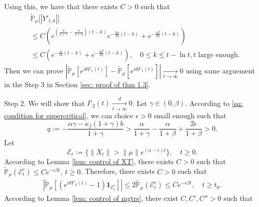\documentclass[12pt]{amsart}
\theoremstyle{plain}
\theoremstyle{definition}
\numberwithin{equation}{section}
\begin{document}
	Using this, we have that there exists $C > 0$ such that
\begin{align*}
    &\mathbb{\tilde{P}}_{\mu}\big[|Y'_{t,k}|\big]
    \\& \leq C( e^{(\frac{\alpha}{1+\gamma} - \frac{\alpha}{1+\beta})(t-k)}e^{-\frac{3\alpha}{32}(t-k)}+ e^{-\frac{\alpha \beta}{32}(t-k)})
    \\& \leq C( e^{-\frac{\alpha}{16}(t-k)}+ e^{-\frac{\alpha \beta}{32}(t-k)}),
    \quad 0 \leq k \leq t - \ln t, t \text{ large enough}.
\end{align*}
	Then we can prove $|\mathbb{\tilde{P}}_{\mu}[e^{i\theta I'_1(t)}]-\mathbb{\tilde{P}}_{\mu}[e^{i\theta\tilde I'_1(t)}]|\xrightarrow[t\to \infty]{} 0$ using same arguement in the Step 3 in Section \ref{sec: proof of thm 1.3}.

	Step 2. 
	We will show that $I'_2(t)\xrightarrow[t\to \infty]{d} 0$. 
	Let $\gamma \in (0,\beta)$.
	According to \eqref{eq: condition for supercritical}, we can choice $\epsilon > 0$ small enough such that
\[
	q:= - \frac{\alpha \gamma-\kappa_f(1+\gamma)b}{1+\gamma} 
	> \frac{\alpha}{1+\gamma}-\frac{\alpha}{1+\beta} + \frac{2\epsilon}{1+\beta} > 0.
\]
	Let 
\[
	\mathcal E_t
	:=\{\|X_t\|>\|\mu\|e^{(\alpha-\epsilon )t}\},
	\quad t\geq 0.
\]
	According to Lemma \ref{lem: control of XT}, there exists
	$C>0$ such that  $\mathbb{\tilde{P}}_{\mu}(\mathcal E_t^c)\leq C e^{-\epsilon \beta t},~t\geq 0$.
	Therefore, there exists $C>0$ such that
\begin{align}
    |\mathbb{\tilde{P}}_{\mu}[(e^{i\theta I'_2(t)}-1)\mathbf{1}_{\mathcal{E}^{c}_t}]|
    \leq 2\mathbb{\tilde{P}}_{\mu}(\mathcal{E}^c_t)\leq Ce^{-\epsilon \beta t},
    \quad t\geq t_0.
\end{align}
	According to Lemma \ref{lem: control of mgtrs}, there exist $C,C',C''>0$ such that
\end{document}
